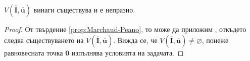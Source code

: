 
\begin{corollary}
  $V(\bar{\mathbf{I}}, \bar{\mathbf{u}})$ винаги съществува и е непразно.
\end{corollary}

\begin{proof}
  От твърдение \ref{prop:Marchaud-Peano}, то може да приложим \cite[теорема~4.1.2]{Aubin1991}, откъдето следва съществуването на $V(\bar{\mathbf{I}}, \bar{\mathbf{u}})$.
  Вижда се, че $V(\bar{\mathbf{I}}, \bar{\mathbf{u}}) \neq \varnothing$, понеже равновесната точка $\mathbf{0}$ изпълнява условията на задачата.
\end{proof}

